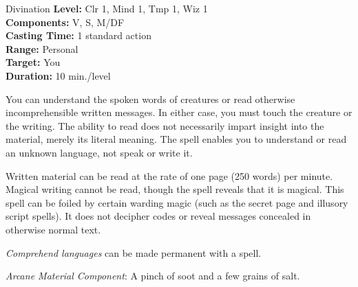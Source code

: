 {Divination}
{
	\textbf{Level:}
	Clr 1, Mind 1, Tmp 1, Wiz 1\\
	\textbf{Components:}
	V, S, M/DF\\
	\textbf{Casting Time:}
	1 standard action\\
	\textbf{Range:}
	Personal\\
	\textbf{Target:}
	You\\
	\textbf{Duration:}
	10 min./level\\
}
{
	You can understand the spoken words of creatures or read otherwise incomprehensible written messages. In either case, you must touch the creature or the writing. The ability to read does not necessarily impart insight into the material, merely its literal meaning. The spell enables you to understand or read an unknown language, not speak or write it.

	Written material can be read at the rate of one page (250 words) per minute. Magical writing cannot be read, though the spell reveals that it is magical. This spell can be foiled by certain warding magic (such as the secret page and illusory script spells). It does not decipher codes or reveal messages concealed in otherwise normal text.

	\emph{Comprehend languages} can be made permanent with a  spell.

	\textit{Arcane Material Component}:
	A pinch of soot and a few grains of salt.

}
